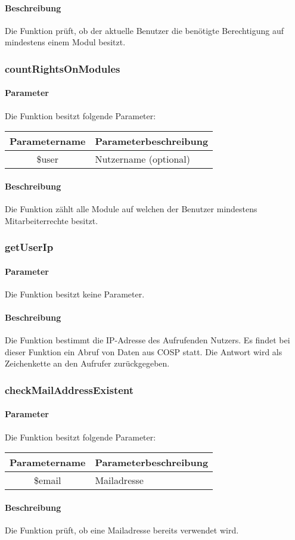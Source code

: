 \paragraph{Beschreibung} Die Funktion prüft, ob der aktuelle Benutzer die benötigte Berechtigung auf mindestens einem Modul besitzt.
\subsubsection{countRightsOnModules}
\paragraph{Parameter} Die Funktion besitzt folgende Parameter:
\begin{table}[H]
	\begin{tabular}{|c|p{11cm}|}
		\hline
		\textbf{Parametername} & \textbf{Parameterbeschreibung} \\ \hline
		\$user & Nutzername (optional) \\ \hline
	\end{tabular}
\end{table}
\paragraph{Beschreibung} Die Funktion zählt alle Module auf welchen der Benutzer mindestens Mitarbeiterrechte besitzt.
\subsubsection{getUserIp}
\paragraph{Parameter} Die Funktion besitzt keine Parameter.
\paragraph{Beschreibung} Die Funktion bestimmt die IP-Adresse des Aufrufenden Nutzers. Es findet bei dieser Funktion ein Abruf von Daten aus {\glqq COSP\grqq} statt. Die Antwort wird als Zeichenkette an den Aufrufer zurückgegeben.
\subsubsection{checkMailAddressExistent}
\paragraph{Parameter} Die Funktion besitzt folgende Parameter:
\begin{table}[H]
	\begin{tabular}{|c|p{11cm}|}
		\hline
		\textbf{Parametername} & \textbf{Parameterbeschreibung} \\ \hline
		\$email & Mailadresse \\ \hline
	\end{tabular}
\end{table}
\paragraph{Beschreibung} Die Funktion prüft, ob eine Mailadresse bereits verwendet wird.